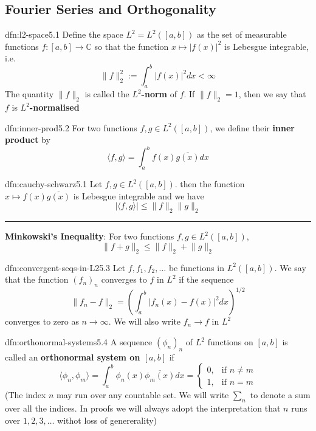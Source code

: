 \documentclass[landscape, 8pt]{extarticle}
\begin{document}
\begin{multicols}{3}
\section{Fourier Series and Orthogonality}

\begin{dfn}{dfn:l2-space}{5.1}
	Define the space $L^{2} = L^{2}([a, b])$ as the set of measurable functions $f : [a, b] \to \mathbb{C}$ so that the function $x \mapsto \lvert f(x) \rvert^{2}$ is Lebesgue integrable, i.e.
	\[\lVert f \rVert^{2}_{2} := \int_{a}^{b} \lvert f(x) \rvert^{2} dx < \infty\]
	The quantity $\lVert f \rVert_{2}$ is called the \textbf{$L^{2}$-norm} of $f$. If $\lVert f \rVert_{2} = 1$, then we say that $f$ is \textbf{$L^{2}$-normalised}
\end{dfn}

\begin{dfn}{dfn:inner-prod}{5.2}
	For two functions $f, g\in L^{2}([a,b])$, we define their \textbf{inner product} by
	\[\langle f, g \rangle = \int_{a}^{b} f(x)\overline{g(x)} dx\]
\end{dfn}

\begin{thm}{dfn:cauchy-schwarz}{5.1}
	Let $f, g\in L^{2}([a, b])$. then the function $x \mapsto f(x)\overline{g(x)}$ is Lebesgue integrable and we have
	\[\lvert \langle f, g \rangle \rvert \le \lVert f \rVert_{2} \lVert g \rVert_{2}\]

	\noindent\rule{\textwidth}{0.2pt}
	\textbf{Minkowski's Inequality}: For two functions $f, g\in L^{2}([a, b])$,
	\[\lVert f + g \rVert_{2} \le \lVert f \rVert_{2} + \lVert g \rVert_{2}\]
\end{thm}

\begin{dfn}{dfn:convergent-seqs-in-L2}{5.3}
	Let $f,f_{1},f_{2},\dots$ be functions in $L^{2}([a, b])$. We say that the function $(f_{n})_{n}$ converges to $f$ in $L^{2}$ if the sequence
	\[\lVert f_{n} - f \rVert_{2} = \left(\int_{a}^{b} \lvert f_{n}(x) - f(x) \rvert^{2} dx\right)^{1 /2}\]
	converges to zero as $n \to \infty$. We will also write $f_{n} \to f$ in $L^{2}$
\end{dfn}

\begin{dfn}{dfn:orthonormal-systems}{5.4}
	A sequence $(\phi_{n})_{n}$ of $L^{2}$ functions on $[a, b]$ is called an \textbf{orthonormal system on $[a, b]$} if
	\[\langle \phi_{n}, \phi_{m} \rangle = \int_{a}^{b} \phi_{n}(x)\overline{\phi_{m}(x)} dx = \begin{cases}
		0, & \text{if $n \ne m$} \\
		1, & \text{if $n = m$}
	\end{cases}\]
	(The index $n$ may run over any countable set. We will write $\sum_{n}$ to denote a sum over all the indices. In proofs we will always adopt the interpretation that $n$ runs over $1,2,3,\dots$ withot loss of genererality)
\end{dfn}


\end{multicols}
\end{document}
